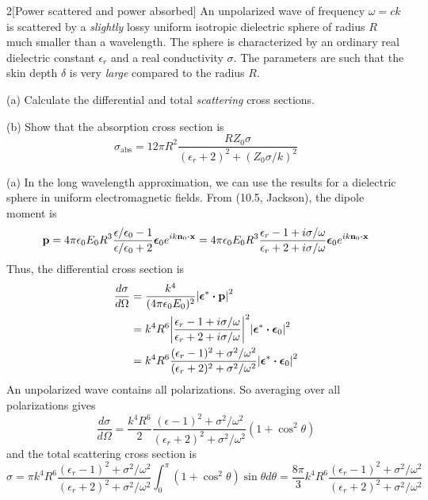 \documentclass[12pt]{article}
\begin{document}
\begin{problem}{2}[Power scattered and power absorbed]
An unpolarized wave of frequency $\omega=ck$ is scattered by a \textit{slightly}
lossy uniform isotropic dielectric sphere of radius $R$ much smaller than a
wavelength. The sphere is characterized by an ordinary real dielectric constant
$\epsilon_r$ and a real conductivity $\sigma$. The parameters are such that the
skin depth $\delta$ is very \textit{large} compared to the radius $R$.

(a) Calculate the differential and total \textit{scattering} cross sections.

(b) Show that the absorption cross section is
\begin{equation}
    \sigma_\text{abs}=12\pi
    R^2\frac{RZ_0\sigma}{(\epsilon_r+2)^2+(Z_0\sigma/k)^2} 
\end{equation}

\begin{solution}
(a) In the long wavelength approximation, we can use the results for a dielectric
sphere in uniform electromagnetic fields. From (10.5, Jackson), the dipole 
moment is
\begin{equation}
    \vb{p}
    =4\pi\epsilon_0E_0R^3\frac{\epsilon/\epsilon_0-1}{\epsilon/\epsilon_0+2}\bm\epsilon_0e^{ik\vb{n}_0\vdot\vb{x}}
    =4\pi\epsilon_0E_0R^3\frac{\epsilon_r-1+i\sigma/\omega}{\epsilon_r+2+i\sigma/\omega}\bm\epsilon_0e^{ik\vb{n}_0\vdot\vb{x}}
\end{equation}
Thus, the differential cross section is
\begin{align}
    \frac{d\sigma}{d\Omega}
    &=\frac{k^4}{(4\pi\epsilon_0E_0)^2}\abs{\bm\epsilon^\ast\vdot\vb{p}}^2\notag\\
    &=k^4R^6\abs{\frac{\epsilon_r-1+i\sigma/\omega}{\epsilon_r+2+i\sigma/\omega}}^2\abs{\bm\epsilon^\ast\vdot\bm\epsilon_0}^2\notag\\
    &=k^4R^6\frac{(\epsilon_r-1)^2+\sigma^2/\omega^2}{(\epsilon_r+2)^2+\sigma^2/\omega^2}\abs{\bm\epsilon^\ast\vdot\bm\epsilon_0}^2
\end{align}
An unpolarized wave contains all polarizations. So averaging over all
polarizations gives
\begin{equation}
    \frac{d\sigma}{d\Omega}=\frac{k^4R^6}{2}\frac{(\epsilon-1)^2+\sigma^2/\omega^2}{(\epsilon_r+2)^2+\sigma^2/\omega^2}(1+\cos^2\theta) 
\end{equation}
and the total scattering cross section is
\begin{equation}
    \sigma=\pi
    k^4R^6\frac{(\epsilon_r-1)^2+\sigma^2/\omega^2}{(\epsilon_r+2)^2+\sigma^2/\omega^2}\int_0^\pi(1+\cos^2\theta)\sin\theta
    d\theta
    =\frac{8\pi}{3}k^4R^6\frac{(\epsilon_r-1)^2+\sigma^2/\omega^2}{(\epsilon_r+2)^2+\sigma^2/\omega^2}
\end{equation}
\end{solution}
\end{problem}
\end{document}
